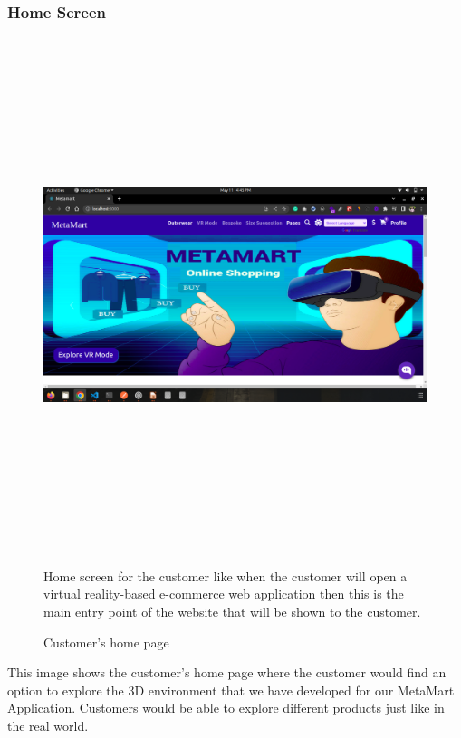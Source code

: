 \subsubsection{Home Screen}
\begin{figure}[H]
    \centering
    \includegraphics[width=15cm,height=15cm]{Figures/Websites/Customer/customerDashboard.png}
    \caption{Customer’s home page}
    \label{Customer’s home page}
   Home screen for the customer like when the customer will open a virtual reality-based e-commerce web application then this is the main entry point of the website that will be shown to the customer.
\end{figure}
\justifying
This image shows the customer’s home page where the customer would find an option to explore the 3D environment that we have developed for our MetaMart Application. Customers would be able to explore different products just like in the real world.
